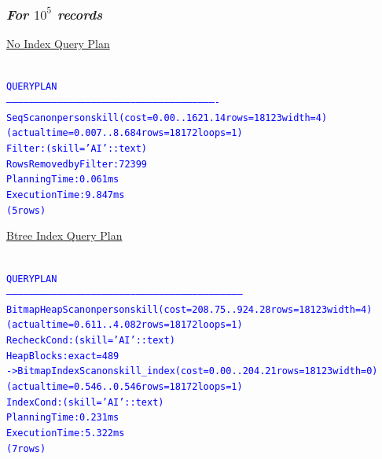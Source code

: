 \documentclass{article}
\begin{document}
    \subsubsection*{\emph{For $10^5$ records}}
    \underline{No Index Query Plan}
    \begin{center}
      {\tiny
      \begin{alltt}
      \textcolor{blue}{
        QUERY PLAN                                                   
        ----------------------------------------------------------------------------------------------------------------
         Seq Scan on personskill  (cost=0.00..1621.14 rows=18123 width=4) (actual time=0.007..8.684 rows=18172 loops=1)
           Filter: (skill = 'AI'::text)
           Rows Removed by Filter: 72399
         Planning Time: 0.061 ms
         Execution Time: 9.847 ms
        (5 rows)
       }
      \end{alltt}
      }
      \end{center}
    \underline{Btree Index Query Plan}
    \begin{center}
      {\tiny
      \begin{alltt}
      \textcolor{blue}{
        QUERY PLAN                                                          
        ------------------------------------------------------------------------------------------------------------------------------
         Bitmap Heap Scan on personskill  (cost=208.75..924.28 rows=18123 width=4) (actual time=0.611..4.082 rows=18172 loops=1)
           Recheck Cond: (skill = 'AI'::text)
           Heap Blocks: exact=489
           ->  Bitmap Index Scan on skill_index  (cost=0.00..204.21 rows=18123 width=0) (actual time=0.546..0.546 rows=18172 loops=1)
                 Index Cond: (skill = 'AI'::text)
         Planning Time: 0.231 ms
         Execution Time: 5.322 ms
        (7 rows)
       }
      \end{alltt}
      }
      \end{center}
\end{document}
